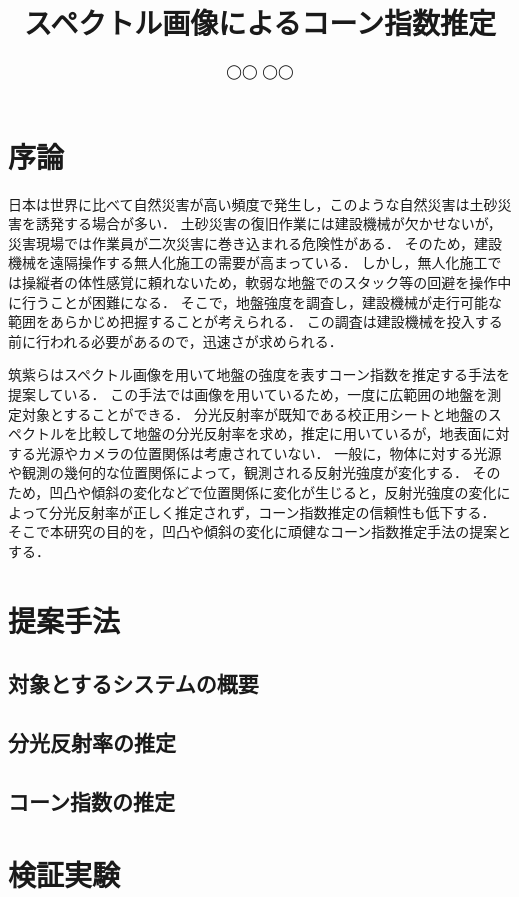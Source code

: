 \documentclass{/workdir/classes/summary}
\title{スペクトル画像によるコーン指数推定}
\author{◯◯ ◯◯}
\begin{document}
\maketitle

\section{序論}
日本は世界に比べて自然災害が高い頻度で発生し，このような自然災害は土砂災害を誘発する場合が多い．
土砂災害の復旧作業には建設機械が欠かせないが，災害現場では作業員が二次災害に巻き込まれる危険性がある．
そのため，建設機械を遠隔操作する無人化施工の需要が高まっている．
しかし，無人化施工では操縦者の体性感覚に頼れないため，軟弱な地盤でのスタック等の回避を操作中に行うことが困難になる．
そこで，地盤強度を調査し，建設機械が走行可能な範囲をあらかじめ把握することが考えられる．
この調査は建設機械を投入する前に行われる必要があるので，迅速さが求められる．

筑紫らはスペクトル画像を用いて地盤の強度を表すコーン指数を推定する手法を提案している\cite{chikushi2020}．
この手法では画像を用いているため，一度に広範囲の地盤を測定対象とすることができる．
分光反射率が既知である校正用シートと地盤のスペクトルを比較して地盤の分光反射率を求め，推定に用いているが，地表面に対する光源やカメラの位置関係は考慮されていない．
一般に，物体に対する光源や観測の幾何的な位置関係によって，観測される反射光強度が変化する．
そのため，凹凸や傾斜の変化などで位置関係に変化が生じると，反射光強度の変化によって分光反射率が正しく推定されず，コーン指数推定の信頼性も低下する．
そこで本研究の目的を，凹凸や傾斜の変化に頑健なコーン指数推定手法の提案とする．

\section{提案手法}
\subsection{対象とするシステムの概要}

\subsection{分光反射率の推定}

\subsection{コーン指数の推定}

\section{検証実験}
\end{document}
